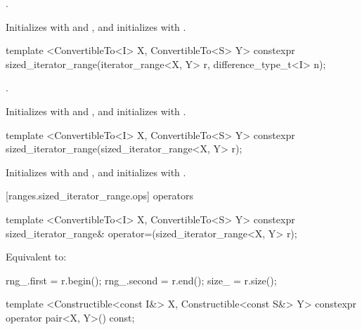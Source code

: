 \begin{itemdescr}
\pnum
\requires {}.

\pnum
\effects Initializes  with  and , and
initializes  with .
\end{itemdescr}

%
\begin{itemdecl}
template <ConvertibleTo<I> X, ConvertibleTo<S> Y>
  constexpr sized_iterator_range(iterator_range<X, Y> r, difference_type_t<I> n);
\end{itemdecl}

\begin{itemdescr}
\pnum
\requires {}.

\pnum
\effects Initializes  with  and , and
initializes  with .
\end{itemdescr}

%
\begin{itemdecl}
template <ConvertibleTo<I> X, ConvertibleTo<S> Y>
  constexpr sized_iterator_range(sized_iterator_range<X, Y> r);
\end{itemdecl}

\begin{itemdescr}
\pnum
\effects Initializes  with  and , and
initializes  with .
\end{itemdescr}

[ranges.sized_iterator_range.ops]{ operators}

%
\begin{itemdecl}
template <ConvertibleTo<I> X, ConvertibleTo<S> Y>
  constexpr sized_iterator_range& operator=(sized_iterator_range<X, Y> r);
\end{itemdecl}

\begin{itemdescr}
\pnum
\effects Equivalent to:
\begin{codeblock}
rng_.first = r.begin();
rng_.second = r.end();
size_ = r.size();
\end{codeblock}
\end{itemdescr}

%
\begin{itemdecl}
template <Constructible<const I&> X, Constructible<const S&> Y>
  constexpr operator pair<X, Y>() const;
\end{itemdecl}


